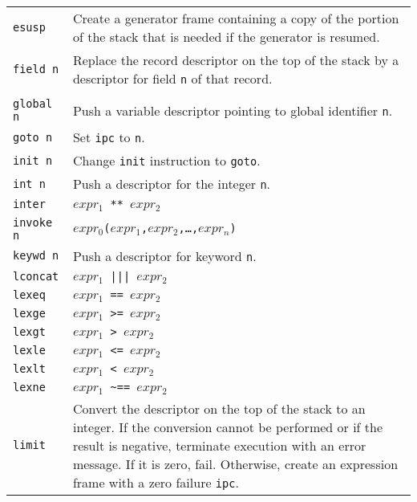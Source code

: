 \begin{xtabular}{l@{\hspace{1.5cm}}p{13.5cm}}
\texttt{esusp} & Create a generator frame containing a copy of the portion of
the stack that is needed if the generator is resumed.\\

\texttt{field n} & Replace the record descriptor on the top of the stack by a
descriptor for field \texttt{n} of that record.\\

\\

\texttt{global n} & Push a variable descriptor pointing to global identifier \texttt{n}.\\

\texttt{goto n} & Set \texttt{ipc} to \texttt{n}.\\

\texttt{init n} & Change \texttt{init} instruction to \texttt{goto}.\\

\texttt{int n}  & Push a descriptor for the integer \texttt{n}.\\

\texttt{inter}  & \texttt{$expr_1$ ** $expr_2$}\\

\texttt{invoke n} & \texttt{$expr_0$($expr_1$,$expr_2$,\dots,$expr_n$)}\\

\texttt{keywd n} & Push a descriptor for keyword \texttt{n}.\\

\texttt{lconcat} & \texttt{$expr_1$ ||| $expr_2$}\\

\texttt{lexeq}   & \texttt{$expr_1$ == $expr_2$}\\

\texttt{lexge}   & \texttt{$expr_1$ >= $expr_2$}\\

\texttt{lexgt}   & \texttt{$expr_1$ > $expr_2$}\\

\texttt{lexle}   & \texttt{$expr_1$ <= $expr_2$}\\

\texttt{lexlt}   & \texttt{$expr_1$ < $expr_2$}\\

\texttt{lexne}   & \texttt{$expr_1$ \textasciitilde== $expr_2$}\\

\texttt{limit}   & Convert the descriptor on the top of the stack to an
integer. If the conversion cannot be performed or if the result is
negative, terminate execution with an error message. If it is zero,
fail. Otherwise, create an expression frame with a zero failure \texttt{ipc}.\\


\end{xtabular}
